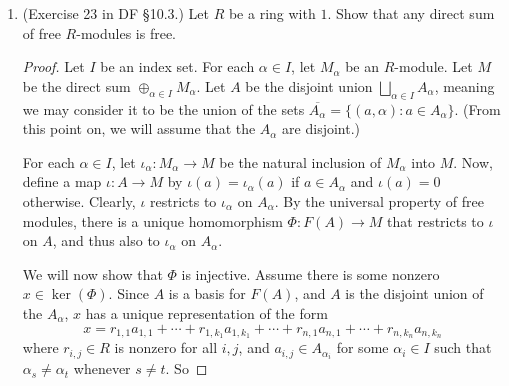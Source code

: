 \documentclass[10pt]{article}
\DeclareMathOperator*{\End}{End}
\begin{document}
\begin{enumerate}
\begin{proof}
If $M$ is an irreducible $R$-module, and $\varphi \in \End_R(M)$, then $\varphi: M \rightarrow M$ is an $R$-module homomorphism from an irreducible module to an irreducible module, thus by this exercise it is an isomorphism.  Therefore, it has a unique inverse isomorphism $\varphi^{-1} \in \End(M)$ as well.  So $\End(M)$ is a division ring.
\end{proof}

\item (Exercise 23 in DF \S 10.3.) Let $R$ be a ring with $1$.  Show that any direct sum of free $R$-modules is free.

\begin{proof}
Let $I$ be an index set.  For each $\alpha \in I$, let $M_\alpha$ be an $R$-module.  Let $M$ be the direct sum $\oplus_{\alpha \in I} M_\alpha$.  Let $A$ be the disjoint union $\bigsqcup_{\alpha \in I} A_\alpha$, meaning we may consider it to be the union of the sets $\overline{A_\alpha} = \{(a,\alpha) : a \in A_\alpha \}$.  (From this point on, we will assume that the $A_\alpha$ are disjoint.)

For each $\alpha \in I$, let $\iota_\alpha: M_\alpha \rightarrow M$ be the natural inclusion of $M_\alpha$ into $M$.  Now, define a map $\iota:A \rightarrow M$ by $\iota(a) = \iota_\alpha(a)$ if $a \in A_\alpha$ and $\iota(a) = 0$ otherwise.  Clearly, $\iota$ restricts to $\iota_\alpha$ on $A_\alpha$.  By the universal property of free modules, there is a unique homomorphism $\Phi :F(A) \rightarrow M$ that restricts to $\iota$ on $A$, and thus also to $\iota_\alpha$ on $A_\alpha$.

\begin{comment}
Let $\iota_\alpha: A_\alpha \rightarrow M$ be the natural inclusion of $A_\alpha$ into $M$, meaning that $\iota_\alpha (a) = \prod_{\beta \in I} m_\beta$ where $m_\beta = a$ if $\beta = \alpha$ and $m_\beta = 0$ otherwise.  Let $\varphi: A \rightarrow M$ be the natural inclusion of $A$ into $M$, meaning that $\varphi(a) = \iota_\alpha(a)$ if $a \in A_\alpha$ and $\varphi(a) = 0$ otherwise.  Let $\iota: A \rightarrow F(A)$ be the natural inclusion of $A$ into the free $R$-module on $A$.  By the universal property of free modules, there is a unique homomorphism $\Phi : F(A) \rightarrow M$ that restricts to $\varphi$ on $A$.  We will show that $\Phi$ is an isomorphism.
\end{comment}

We will now show that $\Phi$ is injective.  Assume there is some nonzero $x \in \ker(\Phi)$.  Since $A$ is a basis for $F(A)$, and $A$ is the disjoint union of the $A_\alpha$, $x$ has a unique representation of the form
$$
x = r_{1,1}a_{1,1} + \cdots + r_{1,k_1}a_{1,k_1} + \cdots + r_{n,1}a_{n,1} + \cdots + r_{n,k_n}a_{n,k_n}
$$
where $r_{i,j} \in R$ is nonzero for all $i,j$, and $a_{i,j} \in A_{\alpha_i}$ for some $\alpha_i \in I$ such that $\alpha_s \neq \alpha_t$ whenever $s \neq t$.  So


\end{proof}
\end{enumerate}
\end{document}

